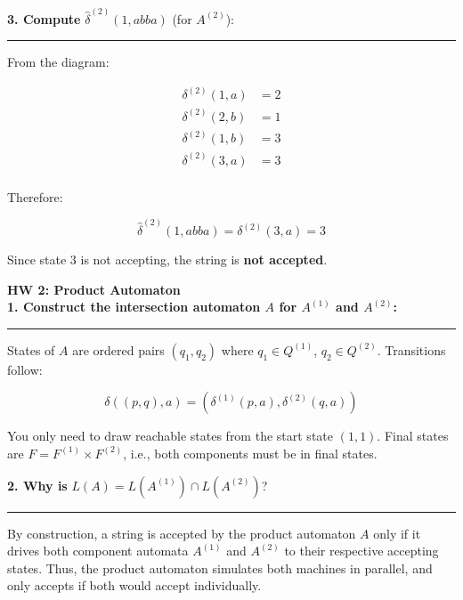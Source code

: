 \documentclass{article}
\theoremstyle{theorem}
\theoremstyle{definition}
\theoremstyle{remark}
\begin{document}
\vspace{1em}
\textbf{3. Compute } \( \hat{\delta}^{(2)}(1, abba) \) (for \( A^{(2)} \)):

\vspace{0.5em}
\hrule
\vspace{0.5em}

From the diagram:

\[
\begin{aligned}
\delta^{(2)}(1, a) &= 2 \\
\delta^{(2)}(2, b) &= 1 \\
\delta^{(2)}(1, b) &= 3 \\
\delta^{(2)}(3, a) &= 3 \\
\end{aligned}
\]

Therefore:

\[
\hat{\delta}^{(2)}(1, abba) = \delta^{(2)}(3, a) = 3
\]

Since state 3 is not accepting, the string is \textbf{not accepted}.

\vspace{2em}
\textbf{HW 2: Product Automaton} \\

\textbf{1. Construct the intersection automaton \( A \) for \( A^{(1)} \) and \( A^{(2)} \):}

\vspace{0.5em}
\hrule
\vspace{0.5em}

States of \( A \) are ordered pairs \( (q_1, q_2) \) where \( q_1 \in Q^{(1)} \), \( q_2 \in Q^{(2)} \).  
Transitions follow:

\[
\delta((p, q), a) = (\delta^{(1)}(p, a), \delta^{(2)}(q, a))
\]

You only need to draw reachable states from the start state \( (1, 1) \).  
Final states are \( F = F^{(1)} \times F^{(2)} \), i.e., both components must be in final states.

\vspace{1em}
\textbf{2. Why is } \( L(A) = L(A^{(1)}) \cap L(A^{(2)}) \)?

\vspace{0.5em}
\hrule
\vspace{0.5em}

By construction, a string is accepted by the product automaton \( A \) only if it drives both component automata \( A^{(1)} \) and \( A^{(2)} \) to their respective accepting states.  
Thus, the product automaton simulates both machines in parallel, and only accepts if both would accept individually.
\end{document}
